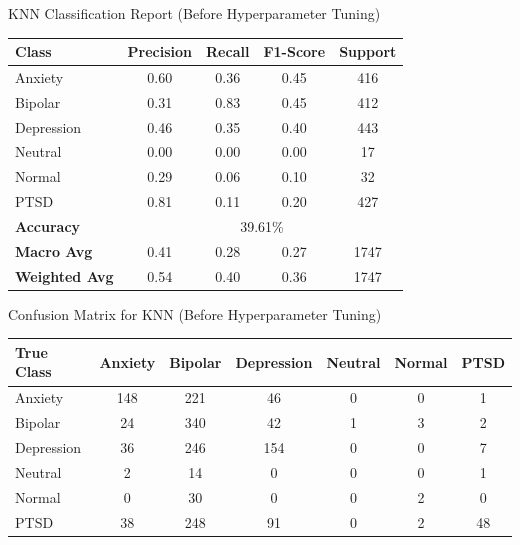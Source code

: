\begin{center}
    KNN Classification Report (Before Hyperparameter Tuning)
\begin{tabular}{|l|c|c|c|c|}
\hline
\textbf{Class} & \textbf{Precision} & \textbf{Recall} & \textbf{F1-Score} & \textbf{Support} \\ \hline
Anxiety        & 0.60               & 0.36            & 0.45              & 416              \\ \hline
Bipolar        & 0.31               & 0.83            & 0.45              & 412              \\ \hline
Depression     & 0.46               & 0.35            & 0.40              & 443              \\ \hline
Neutral        & 0.00               & 0.00            & 0.00              & 17               \\ \hline
Normal         & 0.29               & 0.06            & 0.10              & 32               \\ \hline
PTSD           & 0.81               & 0.11            & 0.20              & 427              \\ \hline
\textbf{Accuracy} & \multicolumn{4}{|c|}{39.61\%} \\ \hline
\textbf{Macro Avg} & 0.41            & 0.28            & 0.27              & 1747             \\ \hline
\textbf{Weighted Avg} & 0.54         & 0.40            & 0.36              & 1747             \\ \hline
\end{tabular}


\vspace{0.25in}

Confusion Matrix for KNN (Before Hyperparameter Tuning)
\begin{tabular}{|l|c|c|c|c|c|c|}
\hline
\textbf{True Class} & \textbf{Anxiety} & \textbf{Bipolar} & \textbf{Depression} & \textbf{Neutral} & \textbf{Normal} & \textbf{PTSD} \\ \hline
Anxiety             & 148              & 221              & 46                  & 0                & 0               & 1             \\ \hline
Bipolar             & 24               & 340              & 42                  & 1                & 3               & 2             \\ \hline
Depression          & 36               & 246              & 154                 & 0                & 0               & 7             \\ \hline
Neutral             & 2                & 14               & 0                   & 0                & 0               & 1             \\ \hline
Normal              & 0                & 30               & 0                   & 0                & 2               & 0             \\ \hline
PTSD                & 38               & 248              & 91                  & 0                & 2               & 48            \\ \hline
\end{tabular}



\end{center}
